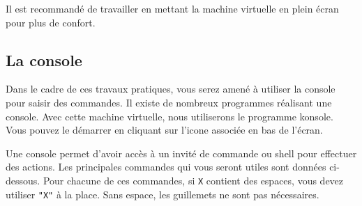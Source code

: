 \begin{tipsandhints}
Il est recommandé de travailler en mettant la machine virtuelle en plein écran pour plus de confort.
\end{tipsandhints}

\subsection{La console}

Dans le cadre de ces travaux pratiques, vous serez amené à utiliser la console pour saisir des commandes. Il existe de nombreux programmes réalisant une console. Avec cette machine virtuelle, nous utiliserons le programme \og{}konsole\fg{}. Vous pouvez le démarrer en cliquant sur l'icone associée en bas de l'écran.

Une console permet d'avoir accès à un invité de commande ou \og{}shell\fg{} pour effectuer des actions. Les principales commandes qui vous seront utiles sont données ci-dessous. Pour chacune de ces commandes, si \verb-X- contient des espaces, vous devez utiliser \verb-"X"- à la place. Sans espace, les guillemets ne sont pas nécessaires.

